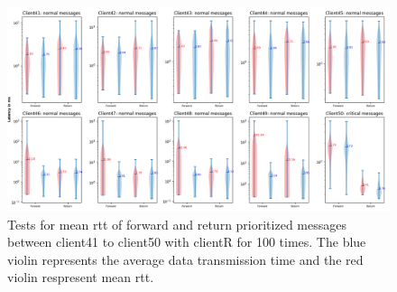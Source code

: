 \begin{figure}
    \includegraphics[width=\textheight]{figures/appendix/priority_tests/log_violin_50clients_figure_5.png}\hfill 
    \caption{Tests for mean \gls{rtt} of forward and return prioritized messages between client41 to client50 
    with clientR for 100 times. The blue violin represents the average data transmission time and the red violin 
    respresent mean \gls{rtt}.} \label{fig: priority-50clients-e}
\end{figure}
